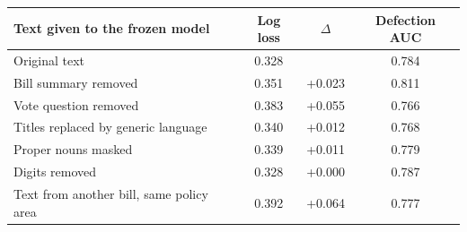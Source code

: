 \begin{tabular}{lccc}
\toprule
Text given to the frozen model & Log loss & $\Delta$ & Defection AUC \\
\midrule
Original text & 0.328 &  & 0.784 \\
Bill summary removed & 0.351 & +0.023 & 0.811 \\
Vote question removed & 0.383 & +0.055 & 0.766 \\
Titles replaced by generic language & 0.340 & +0.012 & 0.768 \\
Proper nouns masked & 0.339 & +0.011 & 0.779 \\
Digits removed & 0.328 & +0.000 & 0.787 \\
Text from another bill, same policy area & 0.392 & +0.064 & 0.777 \\
\bottomrule
\end{tabular}
